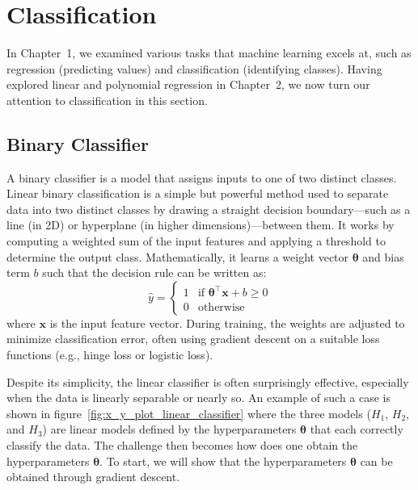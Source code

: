 \documentclass[12pt,letter]{article}
\begin{document}
	\setcounter{section}{3}	
	\setcounter{figure}{0}   
	\renewcommand\thefigure{\thesection.\arabic{figure}}
	\setcounter{equation}{\thesection}   
	\renewcommand\theequation{\thesection.\arabic{equation}}

	\section{Classification}

In Chapter~1, we examined various tasks that machine learning excels at, such as regression (predicting values) and classification (identifying classes). Having explored linear and polynomial regression in Chapter~2, we now turn our attention to classification in this section.







\subsection{Binary Classifier}

A binary classifier is a model that assigns inputs to one of two distinct classes.
Linear binary classification is a simple but powerful method used to separate data into two distinct classes by drawing a straight decision boundary---such as a line (in 2D) or hyperplane (in higher dimensions)---between them. It works by computing a weighted sum of the input features and applying a threshold to determine the output class. Mathematically, it learns a weight vector $\boldsymbol{\theta}$ and bias term $b$ such that the decision rule can be written as:
\begin{equation}
\hat{y} = \begin{cases}
1 & \text{if } \boldsymbol{\theta}^{\top} \mathbf{x} + b \geq 0 \\
0 & \text{otherwise}
\end{cases}
\end{equation}
where $\mathbf{x}$ is the input feature vector. During training, the weights are adjusted to minimize classification error, often using gradient descent on a suitable loss functions (e.g., hinge loss or logistic loss). 

Despite its simplicity, the linear classifier is often surprisingly effective, especially when the data is linearly separable or nearly so. An example of such a case is shown in figure~\ref{fig:x_y_plot_linear_classifier} where the three models ($H_1$, $H_2$, and $H_3$) are linear models defined by the hyperparameters $ \boldsymbol{\theta}$ that each correctly classify the data. The challenge then becomes how does one obtain the hyperparameters $ \boldsymbol{\theta}$. To start, we will show that the hyperparameters $ \boldsymbol{\theta}$ can be obtained through gradient descent.
\end{document}
